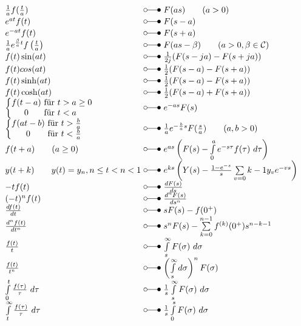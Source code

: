 \begin{footnotesize}
\[ \begin{array}{@{}l@{ ~ \laplace ~ }l@{}}
\frac{1}{a} f(\frac{t}{a}) &
    F(a s) \qquad (a > 0) \\
e^{a t} f(t) &
    F(s - a) \\
e^{- a t} f(t) & 
    F(s + a) \\
\frac{1}{a} e^{\frac{\beta}{a}t} f\left(\frac{t}{a}\right) & 
    F(as - \beta) \qquad (a > 0, \beta \in \mathcal{C})\\
f(t) \sin(at) &
    \frac{1}{2 j}(F(s - ja) - F(s + ja)) \\
f(t) cos(at) &
    \frac{1}{2} (F(s - a) - F(s + a)) \\
f(t) \sinh(at) & 
    \frac{1}{2} (F(s - a) - F(s + a)) \\
f(t) \cosh(at) & 
    \frac{1}{2} (F(s - a) + F(s + a)) \\
\left\lbrace \begin{array}{@{}c@{}c@{}l} 
f(t - a) & \text{ für } & t > a \geq 0 \\
0        & \text{ für } & t < a
\end{array} \right. &
    e^{-as} F(s) \\
\left\lbrace \begin{array}{@{}c@{}c@{}l} 
f(at - b) & \text{ für } & t > \frac{b}{a} \\
0        & \text{ für } & t < \frac{b}{a}
\end{array} \right. &
    \frac{1}{a} e^{-\frac{b}{a}s} F(\frac{s}{a}) \qquad (a, b > 0) \\
f(t + a) \qquad (a \geq 0) &
    e^{as} \left(F(s) - \int\limits_0^a e^{-s \tau} f(\tau) ~ d\tau\right) \\
y(t + k) \qquad y(t) = y_n, n \leq t < n < 1 &
    e^{ks} \left(Y(s) - \frac{1 - e^{-s}}{s} \sum\limits_{v=0}{k-1} y_v e^{-vs}\right) \\
-t f(t) &
    \frac{d F(s)}{ds} \\
(-t)^n f(t) &
    \frac{d^n F(s)}{d s^n} \\
\frac{d f(t)}{dt} &
    s F(s) - f(0^+) \\
\frac{d^n f(t)}{d t^n} &
    s^n F(s) - \sum\limits_{k=0}^{n-1} f^{(k)} (0^+) s^{n-k-1} \\
\frac{f(t)}{t} &
    \int\limits_s^\infty F(\sigma) ~ d\sigma \\
\frac{f(t)}{t^n} &
    \left(\int\limits_s^\infty d\sigma\right)^n F(\sigma) \\
\int\limits_0^t \frac{f(\tau)}{\tau} ~ d \tau &
    \frac{1}{s} \int\limits_s^\infty F(\sigma) ~ d\sigma \\
\int\limits_t^\infty \frac{f(\tau)}{\tau} ~ d\tau &
    \frac{1}{s} \int\limits_0^s F(\sigma) ~ d\sigma \\
\end{array} \]


\end{footnotesize}
